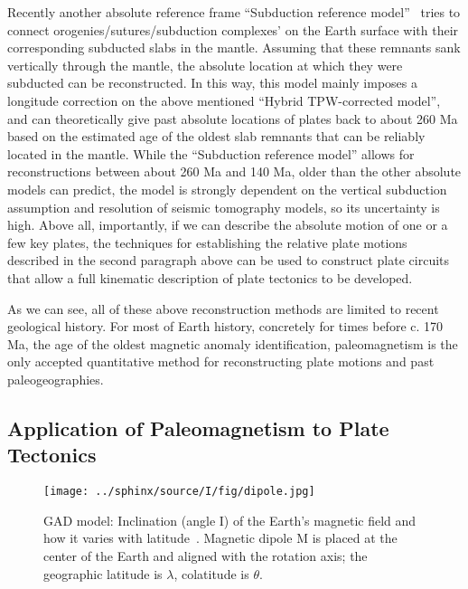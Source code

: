 Recently another absolute reference frame ``Subduction reference
model''~\cite{v10} tries to connect orogenies/sutures/subduction complexes' on
the Earth surface with their corresponding subducted slabs in the mantle.
Assuming that these remnants sank vertically through the mantle, the absolute
location at which they were subducted can be reconstructed. In this way, this
model mainly imposes a longitude correction on the above mentioned ``Hybrid
TPW-corrected model'', and can theoretically give past absolute locations of
plates back to about 260 Ma based on the estimated age of the oldest slab
remnants that can be reliably located in the mantle. While the ``Subduction
reference model'' allows for reconstructions between about 260 Ma and 140 Ma,
older than the other absolute models can predict, the model is strongly
dependent on the vertical subduction assumption and resolution of seismic
tomography models, so its uncertainty is high. Above all, importantly, if we can
describe the absolute motion of one or a few key plates, the techniques for
establishing the relative plate motions described in the second paragraph above
can be used to construct plate circuits that allow a full kinematic description
of plate tectonics to be developed.

As we can see, all of these above reconstruction methods are limited to recent
geological history. For most of Earth history, concretely for times before c.
170 Ma, the age of the oldest magnetic anomaly identification, paleomagnetism
is the only accepted quantitative method for reconstructing plate motions and
past paleogeographies.

\subsection{Application of Paleomagnetism to Plate Tectonics}

\begin{figure}
    \centering
        \texttt{[image: ../sphinx/source/I/fig/dipole.jpg]}
    \captionsetup{width=.95\textwidth}
    \caption{GAD model: Inclination (angle I) of the Earth's magnetic field and how it
    varies with latitude~\cite{B98,T19,T08}. Magnetic dipole M is placed at the
	center of the Earth and aligned with the rotation axis; the geographic
	latitude is $\lambda$, colatitude is $\theta$.}\label{Fig:chap_intro_gad}
\end{figure}

